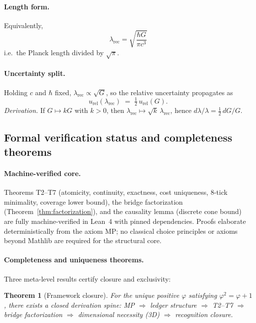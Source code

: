 \documentclass[11pt]{article}
\newtheorem{theorem}{Theorem}[section]
\begin{document}
\paragraph{Length form.}
Equivalently,
\[
\boxed{\lambda_{\mathrm{rec}} = \sqrt{\frac{\hbar G}{\pi c^3}}}
\]
i.e.\ the Planck length divided by $\sqrt{\pi}$.

\paragraph{Uncertainty split.}
Holding $c$ and $\hbar$ fixed, $\lambda_{\mathrm{rec}}\propto \sqrt{G}$, so the relative uncertainty propagates as
\[
u_{\mathrm{rel}}(\lambda_{\mathrm{rec}}) \;=\; \tfrac12\,u_{\mathrm{rel}}(G).
\]
\emph{Derivation.} If $G\mapsto kG$ with $k>0$, then $\lambda_{\mathrm{rec}}\mapsto \sqrt{k}\,\lambda_{\mathrm{rec}}$, hence $d\lambda/\lambda=\tfrac12\,dG/G$.

\subsection{Formal verification status and completeness theorems}\label{subsec:meta-stack}

\paragraph{Machine-verified core.} Theorems T2--T7 (atomicity, continuity, exactness, cost uniqueness, 8-tick minimality, coverage lower bound), the bridge factorization (Theorem~\ref{thm:factorization}), and the causality lemma (discrete cone bound) are fully machine-verified in Lean~4 with pinned dependencies. Proofs elaborate deterministically from the axiom MP; no classical choice principles or axioms beyond Mathlib are required for the structural core.

\paragraph{Completeness and uniqueness theorems.} Three meta-level results certify closure and exclusivity:

\begin{theorem}[Framework closure]\label{thm:PrimeClosure}
For the unique positive $\varphi$ satisfying $\varphi^2=\varphi+1$, there exists a closed derivation spine: MP $\Rightarrow$ ledger structure $\Rightarrow$ T2--T7 $\Rightarrow$ bridge factorization $\Rightarrow$ dimensional necessity (3D) $\Rightarrow$ recognition closure.
\end{theorem}
\end{document}
